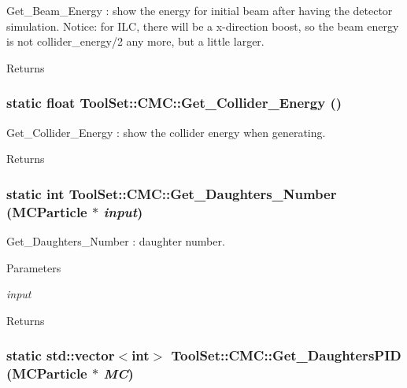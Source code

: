 Get\_\-Beam\_\-Energy : show the energy for initial beam after having the detector simulation. Notice: for ILC, there will be a x-\/direction boost, so the beam energy is not collider\_\-energy/2 any more, but a little larger.

\begin{DoxyReturn}{Returns}

\end{DoxyReturn}
\hypertarget{classToolSet_1_1CMC_a7143149e3db8c1e5055498c8aba88182}{
\subsubsection[{Get\_\-Collider\_\-Energy}]{\setlength{\rightskip}{0pt plus 5cm}static float ToolSet::CMC::Get\_\-Collider\_\-Energy ()}}
\label{classToolSet_1_1CMC_a7143149e3db8c1e5055498c8aba88182}


Get\_\-Collider\_\-Energy : show the collider energy when generating. \begin{DoxyReturn}{Returns}

\end{DoxyReturn}
\hypertarget{classToolSet_1_1CMC_a44a3b5e5df7effa4ed170151cd63b706}{
\subsubsection[{Get\_\-Daughters\_\-Number}]{\setlength{\rightskip}{0pt plus 5cm}static int ToolSet::CMC::Get\_\-Daughters\_\-Number (MCParticle $\ast$ {\em input})}}
\label{classToolSet_1_1CMC_a44a3b5e5df7effa4ed170151cd63b706}


Get\_\-Daughters\_\-Number : daughter number. 
\begin{DoxyParams}{Parameters}
\item[{\em input}]\end{DoxyParams}
\begin{DoxyReturn}{Returns}

\end{DoxyReturn}
\hypertarget{classToolSet_1_1CMC_ae0aeb5054574c5c8ffd3f24e86d662a6}{
\subsubsection[{Get\_\-DaughtersPID}]{\setlength{\rightskip}{0pt plus 5cm}static std::vector$<$int$>$ ToolSet::CMC::Get\_\-DaughtersPID (MCParticle $\ast$ {\em MC})}}
\label{classToolSet_1_1CMC_ae0aeb5054574c5c8ffd3f24e86d662a6}


